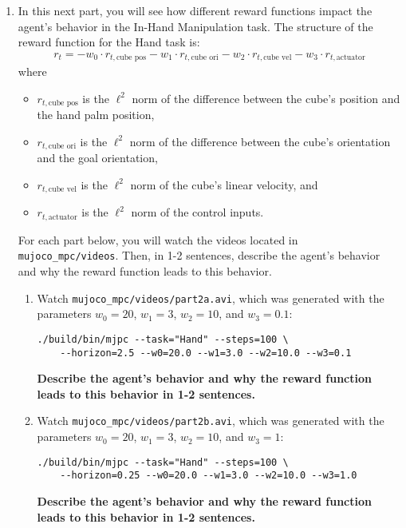 \documentclass[12pt]{article}
\begin{document}
\begin{enumerate}
\item In this next part, you will see how different reward functions impact the agent's behavior in the In-Hand Manipulation task. The structure of the reward function for the Hand task is:
\begin{align*}
    r_t = -w_0 \cdot r_{t, \text{cube pos}} - w_1 \cdot r_{t, \text{cube ori}} - w_2 \cdot r_{t, \text{cube vel}} - w_3 \cdot r_{t, \text{actuator}}
\end{align*}
where
\begin{itemize}
    \item $r_{t, \text{cube pos}}$ is the $\ell^2$ norm of the difference between the cube's position and the hand palm position,
    \item $r_{t, \text{cube ori}}$ is the $\ell^2$ norm of the difference between the cube's orientation and the goal orientation,
    \item $r_{t, \text{cube vel}}$ is the $\ell^2$ norm of the cube's linear velocity, and
    \item $r_{t, \text{actuator}}$ is the $\ell^2$ norm of the control inputs.
\end{itemize}
For each part below, you will watch the videos located in \texttt{mujoco\_mpc/videos}. Then, in 1-2 sentences, describe the agent's behavior and why the reward function leads to this behavior.

\begin{enumerate}[itemsep=20pt]
    \item Watch \texttt{mujoco\_mpc/videos/part2a.avi}, which was generated with the parameters $w_0 = 20$, $w_1 = 3$, $w_2 = 10$, and $w_3 = 0.1$:
\begin{tcolorbox}[width=\linewidth, sharp corners=all, colback=white!95!black]
\begin{verbatim}
./build/bin/mjpc --task="Hand" --steps=100 \
    --horizon=2.5 --w0=20.0 --w1=3.0 --w2=10.0 --w3=0.1
\end{verbatim}
\end{tcolorbox}
    \textbf{\color{red}Describe the agent's behavior and why the reward function leads to this behavior in 1-2 sentences.}

    \item Watch \texttt{mujoco\_mpc/videos/part2b.avi}, which was generated with the parameters $w_0 = 20$, $w_1 = 3$, $w_2 = 10$, and $w_3 = 1$:
\begin{tcolorbox}[width=\linewidth, sharp corners=all, colback=white!95!black]
\begin{verbatim}
./build/bin/mjpc --task="Hand" --steps=100 \
    --horizon=0.25 --w0=20.0 --w1=3.0 --w2=10.0 --w3=1.0
\end{verbatim}
\end{tcolorbox}
    \textbf{\color{red}Describe the agent's behavior and why the reward function leads to this behavior in 1-2 sentences.}


\end{enumerate}
\end{enumerate}
\end{document}
